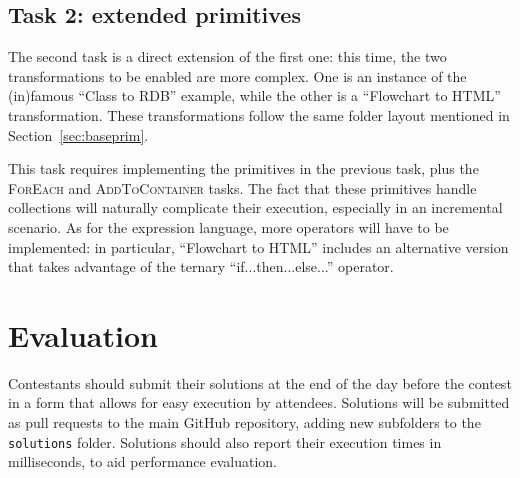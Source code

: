 \documentclass[a4paper]{scrartcl}
\newcommand*{\class}[1]{\textsc{#1}}
\newcommand*{\file}[1]{\texttt{#1}}
\begin{document}

\subsection{Task 2: extended primitives}
\label{sec:extprim}


The second task is a direct extension of the first one: this time, the
two transformations to be enabled are more complex. One is an instance
of the (in)famous ``Class to RDB'' example, while the other is a
``Flowchart to HTML'' transformation. These transformations follow the
same folder layout mentioned in Section~\ref{sec:baseprim}.

This task requires implementing the primitives in the previous task,
plus the \class{ForEach} and \class{AddToContainer} tasks. The fact
that these primitives handle collections will naturally complicate
their execution, especially in an incremental scenario. As for the
expression language, more operators will have to be implemented: in
particular, ``Flowchart to HTML'' includes an alternative version that
takes advantage of the ternary ``if...then...else...'' operator.

\section{Evaluation}
\label{sec:eval}

Contestants should submit their solutions at the end of the day before
the contest in a form that allows for easy execution by
attendees. Solutions will be submitted as pull requests to the main
GitHub repository, adding new subfolders to the \file{solutions}
folder. Solutions should also report their execution times in
milliseconds, to aid performance evaluation.
\end{document}
